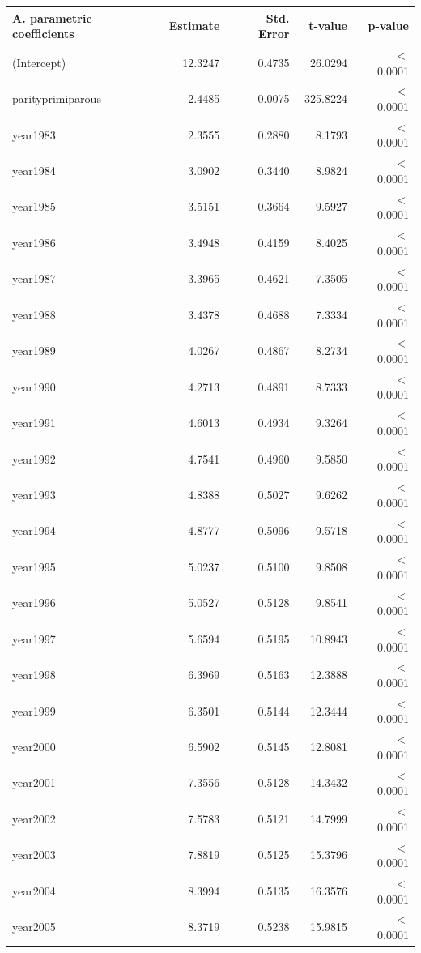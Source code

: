 \begin{table}[ht]
\centering
\begin{tabular}{lrrrr}
\textbf{A. parametric coefficients} & Estimate & Std. Error & t-value & p-value \\ 
    \hline
    \hline
  (Intercept) & 12.3247 & 0.4735 & 26.0294 & $<$ 0.0001 \\ 
  parityprimiparous & -2.4485 & 0.0075 & -325.8224 & $<$ 0.0001 \\ 
  year1983 & 2.3555 & 0.2880 & 8.1793 & $<$ 0.0001 \\ 
  year1984 & 3.0902 & 0.3440 & 8.9824 & $<$ 0.0001 \\ 
  year1985 & 3.5151 & 0.3664 & 9.5927 & $<$ 0.0001 \\ 
  year1986 & 3.4948 & 0.4159 & 8.4025 & $<$ 0.0001 \\ 
  year1987 & 3.3965 & 0.4621 & 7.3505 & $<$ 0.0001 \\ 
  year1988 & 3.4378 & 0.4688 & 7.3334 & $<$ 0.0001 \\ 
  year1989 & 4.0267 & 0.4867 & 8.2734 & $<$ 0.0001 \\ 
  year1990 & 4.2713 & 0.4891 & 8.7333 & $<$ 0.0001 \\ 
  year1991 & 4.6013 & 0.4934 & 9.3264 & $<$ 0.0001 \\ 
  year1992 & 4.7541 & 0.4960 & 9.5850 & $<$ 0.0001 \\ 
  year1993 & 4.8388 & 0.5027 & 9.6262 & $<$ 0.0001 \\ 
  year1994 & 4.8777 & 0.5096 & 9.5718 & $<$ 0.0001 \\ 
  year1995 & 5.0237 & 0.5100 & 9.8508 & $<$ 0.0001 \\ 
  year1996 & 5.0527 & 0.5128 & 9.8541 & $<$ 0.0001 \\ 
  year1997 & 5.6594 & 0.5195 & 10.8943 & $<$ 0.0001 \\ 
  year1998 & 6.3969 & 0.5163 & 12.3888 & $<$ 0.0001 \\ 
  year1999 & 6.3501 & 0.5144 & 12.3444 & $<$ 0.0001 \\ 
  year2000 & 6.5902 & 0.5145 & 12.8081 & $<$ 0.0001 \\ 
  year2001 & 7.3556 & 0.5128 & 14.3432 & $<$ 0.0001 \\ 
  year2002 & 7.5783 & 0.5121 & 14.7999 & $<$ 0.0001 \\ 
  year2003 & 7.8819 & 0.5125 & 15.3796 & $<$ 0.0001 \\ 
  year2004 & 8.3994 & 0.5135 & 16.3576 & $<$ 0.0001 \\ 
  year2005 & 8.3719 & 0.5238 & 15.9815 & $<$ 0.0001 \\ 

\end{tabular}
\end{table}
